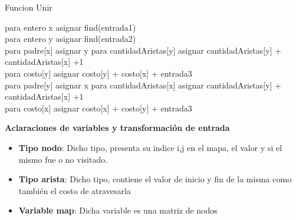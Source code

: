 \begin{algorithm}[H] %
 \caption{Funcion Unir}
 	para entero x asignar find(entrada1)\\
 	para entero y asignar find(entrada2)\\
	 {
	 	para padre[x] asignar y
 	para cantidadAristas[y] asignar cantidadAristas[y] + cantidadAristas[x] +1\\
 	para costo[y] asignar costo[y] + costo[x] + entrada3\\
	}{ 	 	para padre[y] asignar x
 	para cantidadAristas[x] asignar cantidadAristas[y] + cantidadAristas[x] +1\\
 	para costo[x] asignar costo[x] + costo[y] + entrada3\\	}
 
\end{algorithm}


\textbf{Aclaraciones de variables y transformaci\'on de entrada}

\begin{itemize}

\item {\bf Tipo nodo}: Dicho tipo, presenta su indice i,j en el mapa, el valor y si el mismo fue o no visitado.
\item {\bf Tipo arista}: Dicho tipo, contiene el valor de inicio y fin de la misma como tambi\'en el costo de atravesarla
\item {\bf Variable map}: Dicha variable es una matriz de nodos
\end{itemize}  

